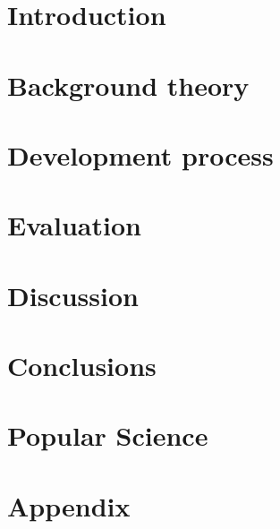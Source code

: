 \documentclass[nofilelist,dvipsnames]{cslthse-msc}
\begin{document}



\tableofcontents

\chapter{Introduction}

  

\chapter{Background theory}

  

\chapter{Development process}

  

\chapter{Evaluation}

  

\chapter{Discussion}

  

\chapter{Conclusions}

  

\chapter{Popular Science}

  


\chapter{Appendix}

  
\end{document}
